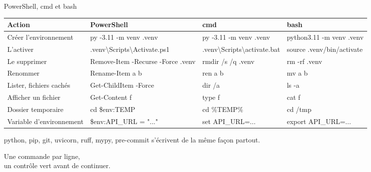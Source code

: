 \documentclass[aspectratio=169,11pt]{beamer}
\newcommand{\co}[1]{{\ttfamily\hyphenchar\font=45\relax #1}}
\newcommand{\bs}{\textbackslash\allowbreak{}}
\begin{document}
\begin{frame}{PowerShell, cmd et bash}
\scriptsize
\begin{tabularx}{\textwidth}{@{}>{\raggedright\arraybackslash}p{3.4cm} >{\raggedright\arraybackslash}X >{\raggedright\arraybackslash}X >{\raggedright\arraybackslash}X@{}}
\toprule
\textbf{Action} & \textbf{PowerShell} & \textbf{cmd} & \textbf{bash} \\
\midrule
Créer l'environnement & \co{py -3.11 -m venv .venv} & \co{py -3.11 -m venv .venv} & \co{python3.11 -m venv .venv} \\
L'activer & \co{.venv\bs Scripts\bs Activate.ps1} & \co{.venv\bs Scripts\bs activate.bat} & \co{source .venv/bin/activate} \\
Le supprimer & \co{Remove-Item -Recurse -Force .venv} & \co{rmdir /s /q .venv} & \co{rm -rf .venv} \\
Renommer & \co{Rename-Item a b} & \co{ren a b} & \co{mv a b} \\
Lister, fichiers cachés & \co{Get-ChildItem -Force} & \co{dir /a} & \co{ls -a} \\
Afficher un fichier & \co{Get-Content f} & \co{type f} & \co{cat f} \\
Dossier temporaire & \co{cd \$env:TEMP} & \co{cd \%TEMP\%} & \co{cd /tmp} \\
Variable d'environnement & \co{\$env:API\_URL = "..."} & \co{set API\_URL=...} & \co{export API\_URL=...} \\
\bottomrule
\end{tabularx}

\medskip
\small \co{python}, \co{pip}, \co{git}, \co{uvicorn}, \co{ruff}, \co{mypy}, \co{pre-commit} s'écrivent de la même
façon partout.
\end{frame}

\begin{frame}[standout]
Une commande par ligne,\\ un contrôle vert avant de continuer.
\end{frame}
\end{document}
